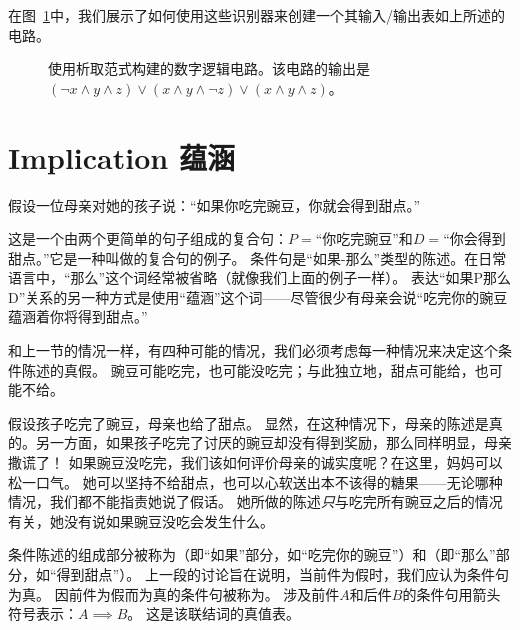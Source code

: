 \begin{center}

\end{center}

在图~\ref{fig:dnf}中，我们展示了如何使用这些识别器来创建一个其输入/输出表如上所述的电路。

\begin{figure}[!hbtp] 
\begin{center}

\end{center}
\caption[析取范式]{使用析取范式构建的数字逻辑电路。该电路的输出是 $({\lnot}x \land y \land z) \lor (x \land y \land {\lnot}z) \lor (x \land y \land z)$。}
\label{fig:dnf}
\end{figure}

\newpage




\newpage

\section{Implication 蕴涵}
\label{sec:impl}

假设一位母亲对她的孩子说：“如果你吃完豌豆，你就会得到甜点。”

这是一个由两个更简单的句子组成的复合句：$P=$“你吃完豌豆”和$D=$“你会得到甜点。”它是一种叫做的复合句的例子。
条件句是“如果-那么”类型的陈述。在日常语言中，“那么”这个词经常被省略（就像我们上面的例子一样）。
表达“如果P那么D”关系的另一种方式是使用“蕴涵”这个词——尽管很少有母亲会说“吃完你的豌豆蕴涵着你将得到甜点。”

和上一节的情况一样，有四种可能的情况，我们必须考虑每一种情况来决定这个条件陈述的真假。
豌豆可能吃完，也可能没吃完；与此独立地，甜点可能给，也可能不给。

假设孩子吃完了豌豆，母亲也给了甜点。
显然，在这种情况下，母亲的陈述是真的。另一方面，如果孩子吃完了讨厌的豌豆却没有得到奖励，那么同样明显，母亲撒谎了！
如果豌豆没吃完，我们该如何评价母亲的诚实度呢？在这里，妈妈可以松一口气。
她可以坚持不给甜点，也可以心软送出本不该得的糖果——无论哪种情况，我们都不能指责她说了假话。
她所做的陈述{\em 只}与吃完所有豌豆之后的情况有关，她没有说如果豌豆没吃会发生什么。

条件陈述的组成部分被称为（即“如果”部分，如“吃完你的豌豆”）和（即“那么”部分，如“得到甜点”）。
上一段的讨论旨在说明，当前件为假时，我们应认为条件句为真。
因前件为假而为真的条件句被称为。
涉及前件$A$和后件$B$的条件句用箭头符号表示：$A \implies B$。
这是该联结词的真值表。

